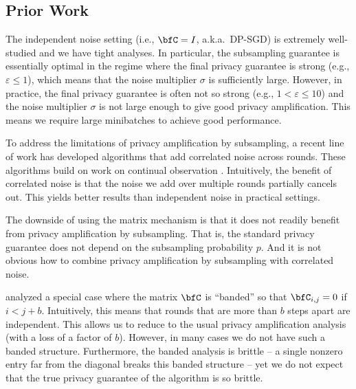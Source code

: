 \subsection{Prior Work}

The independent noise setting (i.e., $\bfC=I$, a.k.a.~DP-SGD) is extremely well-studied \citep{song2013stochastic,BST14,abadi2016deep,mironov2019r,steinke2022composition,koskela2020computing} and we have tight analyses.
In particular, the subsampling guarantee is essentially optimal in the regime where the final privacy guarantee is strong (e.g., $\varepsilon\le1$), which means that the noise multiplier $\sigma$ is sufficiently large.
However, in practice, the final privacy guarantee is often not so strong (e.g., $1<\varepsilon\le10$) and the noise multiplier $\sigma$ is not large enough to give good privacy amplification. This means we require large minibatches to achieve good performance.

To address the limitations of privacy amplification by subsampling, a recent line of work \citep{kairouz2021practical,denisovDPMF,MEMF,xu2023federated} has developed algorithms that add correlated noise across rounds. These algorithms build on work on continual observation \citep{dwork2010differential}.
Intuitively, the benefit of correlated noise is that the noise we add over multiple rounds partially cancels out.
This yields better results than independent noise in practical settings.

The downside of using the matrix mechanism is that it does not readily benefit from privacy amplification by subsampling. That is, the standard privacy guarantee does not depend on the subsampling probability $p$. And it is not obvious how to combine privacy amplification by subsampling with correlated noise.

\citet{BandedMF} analyzed a special case where the matrix $\bfC$ is ``banded'' so that $\bfC_{i,j}=0$ if $i<j+b$. Intuitively, this means that rounds that are more than $b$ steps apart are independent. This allows us to reduce to the usual privacy amplification analysis (with a loss of a factor of $b$).
However, in many cases we do not have such a banded structure.
Furthermore, the banded analysis is brittle -- a single nonzero entry far from the diagonal breaks this banded structure -- yet we do not expect that the true privacy guarantee of the algorithm is so brittle.


